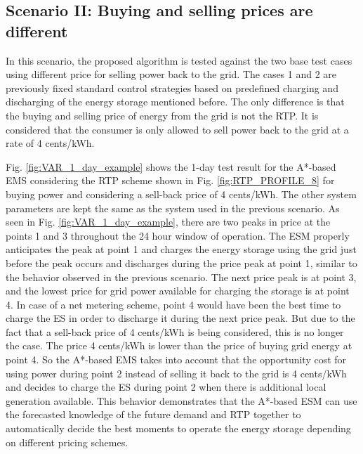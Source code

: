 \subsection{Scenario II: Buying and selling prices are different}
In this scenario, the proposed algorithm is tested against the two base test cases using different price for selling power back to the grid. The cases 1 and 2 are previously fixed standard control strategies based on predefined charging and discharging of the energy storage mentioned before. The only difference is that the buying and selling price of energy from the grid is not the RTP. It is considered that the consumer is only allowed to sell power back to the grid at a rate of 4 cents/kWh.

Fig. \ref{fig:VAR_1_day_example} shows the 1-day test result for the A*-based EMS considering the RTP scheme shown in Fig. \ref{fig:RTP_PROFILE_8} for buying power and considering a sell-back price of 4 cents/kWh. The other system parameters are kept the same as the system used in the previous scenario. As seen in Fig. \ref{fig:VAR_1_day_example}, there are two peaks in price at the points 1 and 3 throughout the 24 hour window of operation. The ESM properly anticipates the peak at point 1 and charges the energy storage using the grid just before the peak occurs and discharges during the price peak at point 1, similar to the behavior observed in the previous scenario. The next price peak is at point 3, and the lowest price for grid power available for charging the storage is at point 4. In case of a net metering scheme, point 4 would have been the best time to charge the ES in order to discharge it during the next price peak. But due to the fact that a sell-back price of 4 cents/kWh is being considered, this is no longer the case. The price 4 cents/kWh is lower than the price of buying grid energy at point 4. So the A*-based EMS takes into account that the opportunity cost for using power during point 2 instead of selling it back to the grid is 4 cents/kWh and decides to charge the ES during point 2 when there is additional local generation available. This behavior demonstrates that the A*-based ESM can use the forecasted knowledge of the future demand and RTP together to automatically decide the best moments to operate the energy storage depending on different pricing schemes.

